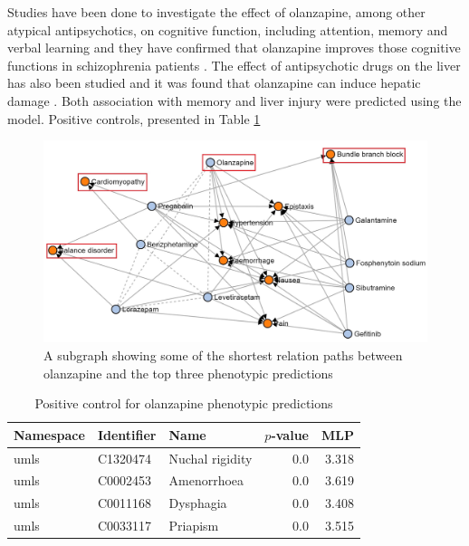 Studies have been done to investigate the effect of olanzapine, among other atypical antipsychotics, on cognitive function, including attention, memory and verbal learning and they have confirmed that olanzapine improves those cognitive functions in schizophrenia patients \cite{mcgurk_cognitive_2004, smith_effects_2001, cuesta_effects_2001, purdon_neuropsychological_2000, bilder_neurocognitive_2002}. The effect of antipsychotic drugs on the liver has also been studied and it was found that olanzapine can induce hepatic damage \cite{lv_antipsychotic_2018}. Both association with memory and liver injury were predicted using the model. Positive controls, presented in Table \ref{tab:ps_olanzapine} 

\begin{figure}[h!]
    \centering
    \includegraphics[scale=0.6]
    {figures/olanzapine_phenotypes.jpg}
    \caption[Olanzapine-phentypes path subgraph]{\label{fig:olanzapine_phenotypes} A subgraph showing some of the shortest relation paths between olanzapine and the top three phenotypic predictions}
\end{figure}

\begin{table}
    \centering
    \begin{tabular}{|l|l|l|r|r|}
        \hline
        \textbf{Namespace} & \textbf{Identifier} & \textbf{Name} & \textbf{$p$-value} & \textbf{MLP} \\
        \hline
        umls & C1320474 & Nuchal rigidity &  0.0 & 3.318 \\
        \hline
        umls & C0002453 &  Amenorrhoea &  0.0 & 3.619 \\
        \hline
        umls & C0011168 &  Dysphagia &  0.0 & 3.408 \\
        \hline
        umls &  C0033117 & Priapism &  0.0 &  3.515 \\
        \hline
    \end{tabular}
    \caption{Positive control for olanzapine phenotypic predictions}
    \label{tab:ps_olanzapine}
\end{table}


